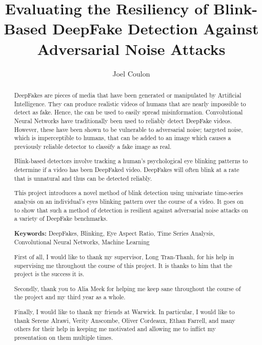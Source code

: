 \documentclass[a4paper]{report}
\author{Joel Coulon}
\title{Evaluating the Resiliency of Blink-Based DeepFake Detection Against Adversarial Noise Attacks}
\begin{document}


\pagestyle{plain}

\begin{abstract}
DeepFakes are pieces of media that have been generated or manipulated by Artificial Intelligence. They can produce realistic videos of humans that are nearly impossible to detect as fake. Hence, the can be used to easily spread misinformation. Convolutional Neural Networks have traditionally been used to reliably detect DeepFake videos. However, these have been shown to be vulnerable to adversarial noise; targeted noise, which is imperceptible to humans, that can be added to an image which causes a previously reliable detector to classify a fake image as real.

Blink-based detectors involve tracking a human's psychological eye blinking patterns to determine if a video has been DeepFaked video. DeepFakes will often blink at a rate that is unnatural and thus can be detected reliably.

This project introduces a novel method of blink detection using univariate time-series analysis on an individual's eyes blinking pattern over the course of a video. It goes on to show that such a method of detection is resilient against adversarial noise attacks on a variety of DeepFake benchmarks.

\textbf{Keywords:} DeepFakes, Blinking, Eye Aspect Ratio, Time Series Analysis, Convolutional Neural Networks, Machine Learning
\end{abstract}

\renewcommand{\abstractname}{Acknowledgements}
\begin{abstract}
First of all, I would like to thank my supervisor, Long Tran-Thanh, for his help in supervising me throughout the course of this project. It is thanks to him that the project is the success it is.

Secondly, thank you to Alia Meek for helping me keep sane throughout the course of the project and my third year as a whole.

Finally, I would like to thank my friends at Warwick. In particular, I would like to thank Serene Alrawi, Verity Anscombe, Oliver Cordeaux, Ethan Farrell, and many others for their help in keeping me motivated and allowing me to inflict my presentation on them multiple times.
\end{abstract}

\tableofcontents
\listoffigures
{}
\listofalgorithms
{}
\listoftables
{}
\newpage








\printbibliography

\appendix

\end{document}

